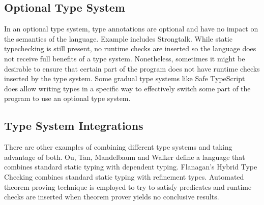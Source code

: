 \subsection{Optional Type System}

In an optional type system\cite{bracha2004pluggable},
type annotations are optional and have no impact on the semantics of the language.
Example includes Strongtalk\cite{bracha1993strongtalk}.
While static typechecking is still present, no runtime checks are inserted
so the language does not receive full benefits of a type system.
Nonetheless, sometimes it might be desirable to ensure that certain part of the program
does not have runtime checks inserted by the type system.
Some gradual type systems like Safe TypeScript\cite{rastogi2015safe} does allow writing
types in a specific way to effectively switch some part of the program to use an optional type system.

\subsection{Type System Integrations}

There are other examples of combining different type systems and taking advantage of both.
Ou, Tan, Mandelbaum and Walker\cite{ou2004dynamic} define a language that combines
standard static typing with dependent typing.
Flanagan's Hybrid Type Checking\cite{flanagan2006hybrid} combines standard static typing
with refinement types. Automated theorem proving technique is employed to try to satisfy predicates
and runtime checks are inserted when theorem prover yields no conclusive results.


